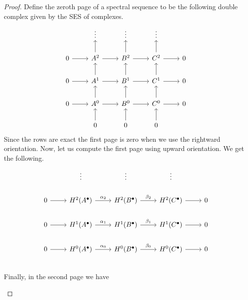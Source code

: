 \begin{proof}
  Define the zeroth page of a spectral sequence to be the following
  double complex given by the SES of complexes.
  \[\begin{tikzcd}
      & \vdots & \vdots & \vdots & \\
      0\rar & A^{2}\rar\uar & B^{2}\rar\uar & C^{2}\rar\uar & 0 \\
      0\rar & A^{1}\rar\uar & B^{1}\rar\uar & C^{1}\rar\uar & 0 \\
      0\rar & A^{0}\rar\uar & B^{0}\rar\uar & C^{0}\rar\uar & 0 \\
      & 0\uar & 0\uar & 0\uar &
    \end{tikzcd}\]
  Since the rows are exact the first page is zero when we use the rightward
  orientation. Now, let us compute the first page using upward orientation.
  We get the following.
  \[\begin{tikzcd}
      & \vdots & \vdots & \vdots & \\
      0\rar & H^{2}(A^{\bullet})\rar{\alpha_{2}}
      & H^{2}(B^{\bullet})\rar{\beta_{2}} & H^{2}(C^{\bullet})\rar & 0 \\
      0\rar & H^{1}(A^{\bullet})\rar{\alpha_{1}}
      & H^{1}(B^{\bullet})\rar{\beta_{1}} & H^{1}(C^{\bullet})\rar & 0 \\
      0\rar & H^{0}(A^{\bullet})\rar{\alpha_{0}}
      & H^{0}(B^{\bullet})\rar{\beta_{0}} & H^{0}(C^{\bullet})\rar & 0 \\
    \end{tikzcd}\]
  Finally, in the second page we have

  \begin{center}
\end{center}
\end{proof}
